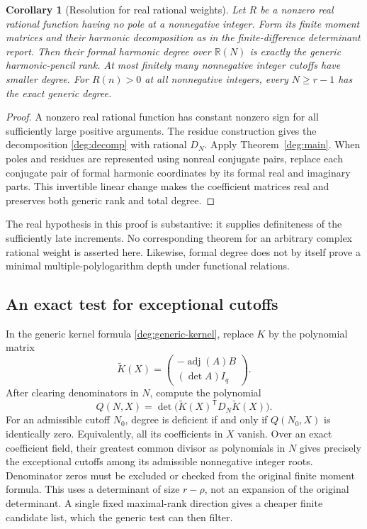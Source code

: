 \documentclass[11pt]{article}
\newtheorem{corollary}[theorem]{Corollary}
\theoremstyle{definition}
\theoremstyle{remark}
\numberwithin{equation}{section}
\begin{document}
\begin{corollary}[Resolution for real rational weights]
\label{deg:rational}
Let $R$ be a nonzero real rational function having no pole at a
nonnegative integer.  Form its finite moment matrices and their
harmonic decomposition as in the finite-difference determinant report.
Then their formal harmonic degree over $\mathbb R(N)$ is exactly the
generic harmonic-pencil rank.  At most finitely many nonnegative
integer cutoffs have smaller degree.  For $R(n)>0$ at all
nonnegative integers, every $N\ge r-1$ has the exact generic degree.
\end{corollary}
\begin{proof}
A nonzero real rational function has constant nonzero sign for all
sufficiently large positive arguments.  The residue construction gives
the decomposition \eqref{deg:decomp} with rational $D_N$.  Apply
Theorem~\ref{deg:main}.  When poles and residues are represented using
nonreal conjugate pairs, replace each conjugate pair of formal harmonic
coordinates by its formal real and imaginary parts.  This invertible
linear change makes the coefficient matrices real and preserves both
generic rank and total degree.
\end{proof}

The real hypothesis in this proof is substantive: it supplies definiteness
of the sufficiently late increments.  No corresponding theorem for an
arbitrary complex rational weight is asserted here.  Likewise, formal
degree does not by itself prove a minimal multiple-polylogarithm depth
under functional relations.

\subsection{An exact test for exceptional cutoffs}

In the generic kernel formula \eqref{deg:generic-kernel}, replace $K$ by
the polynomial matrix
\[
 \widetilde K(X)=
 \begin{pmatrix}-\operatorname{adj}(A)B\\(\det A)I_q\end{pmatrix}.
\]
After clearing denominators in $N$, compute the polynomial
\begin{equation}\label{deg:exception-certificate}
 Q(N,X)=\det\bigl(\widetilde K(X)^{\mathsf T}D_N
                                      \widetilde K(X)\bigr).
\end{equation}
For an admissible cutoff $N_0$, degree is deficient if and only if
$Q(N_0,X)$ is identically zero.  Equivalently, all its coefficients in
$X$ vanish.  Over an exact coefficient field, their greatest common
divisor as polynomials in $N$ gives precisely the exceptional cutoffs
among its admissible nonnegative integer roots.  Denominator zeros must
be excluded or checked from the original finite moment formula.  This
uses a determinant of size $r-\rho$, not an expansion of the original
determinant.  A single fixed maximal-rank direction gives a cheaper
finite candidate list, which the generic test can then filter.
\end{document}
